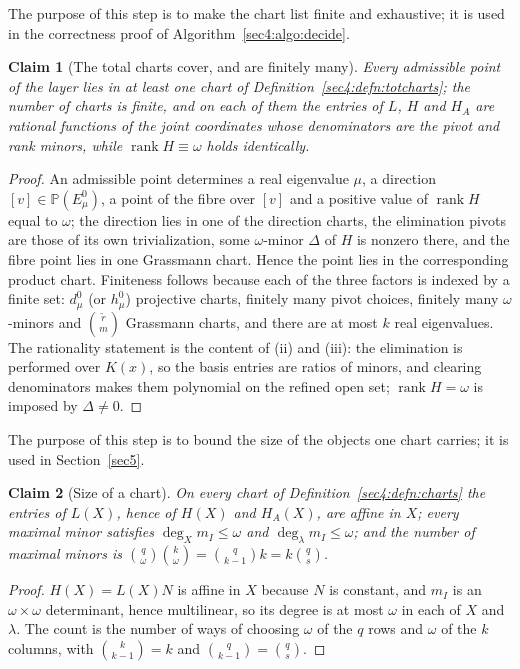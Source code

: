 \documentclass[journal]{IEEEtran}
\theoremstyle{plainn}
\newtheorem{claim}{Claim}
\theoremstyle{remark}
\newcommand{\rank}{\operatorname{rank}}
\begin{document}
The purpose of this step is to make the chart list finite and exhaustive; it is used in the
correctness proof of Algorithm~\ref{sec4:algo:decide}.

\begin{claim}[The total charts cover, and are finitely many]\label{sec4:lem:cover}
Every admissible point of the layer lies in at least one chart of Definition~\ref{sec4:defn:totcharts};
the number of charts is finite, and on each of them the entries of $L$, $H$ and $H_A$ are rational
functions of the joint coordinates whose denominators are the pivot and rank minors, while
$\rank H\equiv\omega$ holds identically.
\end{claim}

\begin{proof}
An admissible point determines a real eigenvalue $\mu$, a direction $[v]\in\mathbb P(E_\mu^0)$, a point
of the fibre over $[v]$ and a positive value of $\rank H$ equal to $\omega$; the direction lies in one
of the direction charts, the elimination pivots are those of its own trivialization, some
$\omega$-minor $\Delta$ of $H$ is nonzero there, and the fibre point lies in one Grassmann chart. Hence
the point lies in the corresponding product chart. Finiteness follows because each of the three factors
is indexed by a finite set: $d_\mu^0$ (or $h_\mu^0$) projective charts, finitely many pivot choices,
finitely many $\omega$-minors and $\binom{\widetilde r}{m}$ Grassmann charts, and there are at most $k$
real eigenvalues. The rationality statement is the content of (ii) and (iii): the elimination is
performed over $K(x)$, so the basis entries are ratios of minors, and clearing denominators makes them
polynomial on the refined open set; $\rank H=\omega$ is imposed by $\Delta\ne0$.
\end{proof}


The purpose of this step is to bound the size of the objects one chart carries; it is used in
Section~\ref{sec5}.

\begin{claim}[Size of a chart]
\label{sec4:lem:minorcount}
On every chart of Definition~\ref{sec4:defn:charts} the entries of $L(X)$, hence of $H(X)$ and
$H_A(X)$, are affine in $X$; every maximal minor satisfies $\deg_X m_I\le\omega$ and
$\deg_\lambda m_I\le\omega$; and the number of maximal minors is
$\binom{q}{\omega}\binom{k}{\omega}=\binom{q}{k-1}k=k\binom{q}{s}$.
\end{claim}

\begin{proof}
$H(X)=L(X)N$ is affine in $X$ because $N$ is constant, and $m_I$ is an $\omega\times\omega$
determinant, hence multilinear, so its degree is at most $\omega$ in each of $X$ and $\lambda$. The
count is the number of ways of choosing $\omega$ of the $q$ rows and $\omega$ of the $k$ columns,
with $\binom{k}{k-1}=k$ and $\binom{q}{k-1}=\binom{q}{s}$.
\end{proof}
\end{document}
